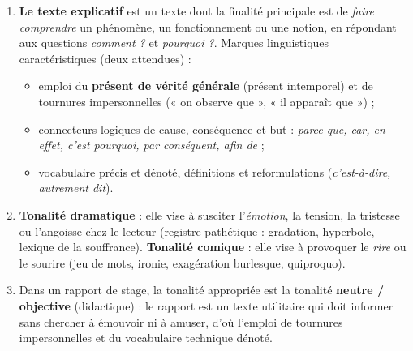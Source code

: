 \documentclass[11pt]{article}
\begin{document}
\begin{corrige}
\begin{enumerate}
    \item \textbf{Le texte explicatif} est un texte dont la finalité principale est de \emph{faire comprendre} un phénomène, un fonctionnement ou une notion, en répondant aux questions \emph{comment ?} et \emph{pourquoi ?}. Marques linguistiques caractéristiques (deux attendues) :
    \begin{itemize}
        \item emploi du \textbf{présent de vérité générale} (présent intemporel) et de tournures impersonnelles (« on observe que », « il apparaît que ») ;
        \item connecteurs logiques de cause, conséquence et but : \emph{parce que, car, en effet, c'est pourquoi, par conséquent, afin de} ;
        \item vocabulaire précis et dénoté, définitions et reformulations (\emph{c'est-à-dire, autrement dit}).
    \end{itemize}
    \item \textbf{Tonalité dramatique} : elle vise à susciter l'\emph{émotion}, la tension, la tristesse ou l'angoisse chez le lecteur (registre pathétique : gradation, hyperbole, lexique de la souffrance). \textbf{Tonalité comique} : elle vise à provoquer le \emph{rire} ou le sourire (jeu de mots, ironie, exagération burlesque, quiproquo).
    \item Dans un rapport de stage, la tonalité appropriée est la tonalité \textbf{neutre / objective} (didactique) : le rapport est un texte utilitaire qui doit informer sans chercher à émouvoir ni à amuser, d'où l'emploi de tournures impersonnelles et du vocabulaire technique dénoté.
\end{enumerate}
\end{corrige}
\end{document}

